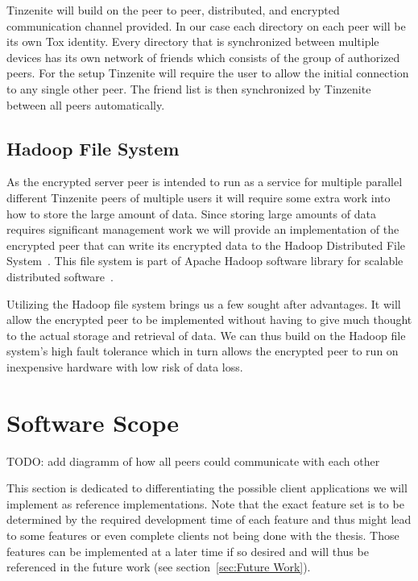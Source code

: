 Tinzenite will build on the peer to peer, distributed, and encrypted communication channel provided.
In our case each directory on each peer will be its own Tox identity.
Every directory that is synchronized between multiple devices has its own network of friends which consists of the group of authorized peers.
For the setup Tinzenite will require the user to allow the initial connection to any single other peer.
The friend list is then synchronized by Tinzenite between all peers automatically.

\subsection{Hadoop File System}
\label{sub:Hadoop File System}

As the encrypted server peer is intended to run as a service for multiple parallel different Tinzenite peers of multiple users it will require some extra work into how to store the large amount of data.
Since storing large amounts of data requires significant management work we will provide an implementation of the encrypted peer that can write its encrypted data to the Hadoop Distributed File System~\cite{borthakur2007hadoop}.
This file system is part of Apache Hadoop software library for scalable distributed software~\cite{web:site:hadoop}.

Utilizing the Hadoop file system brings us a few sought after advantages.
It will allow the encrypted peer to be implemented without having to give much thought to the actual storage and retrieval of data.
We can thus build on the Hadoop file system's high fault tolerance which in turn allows the encrypted peer to run on inexpensive hardware with low risk of data loss.

\section{Software Scope}
\label{sec:Software Scope}

TODO: add diagramm of how all peers could communicate with each other

This section is dedicated to differentiating the possible client applications we will implement as reference implementations.
Note that the exact feature set is to be determined by the required development time of each feature and thus might lead to some features or even complete clients not being done with the thesis.
Those features can be implemented at a later time if so desired and will thus be referenced in the future work (see section~\ref{sec:Future Work}).

